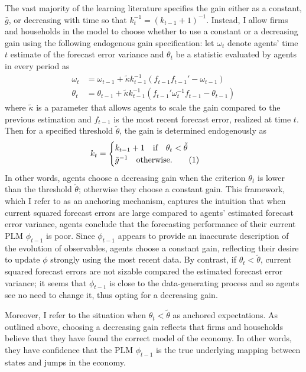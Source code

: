\documentclass[11pt]{article}
\renewcommand{\[}{\begin{equation}}
\renewcommand{\]}{\end{equation}}
\newcommand\numberthis{\addtocounter{equation}{1}\tag{\theequation}} %
\begin{document}
The vast majority of the learning literature specifies the gain either as a constant, $\bar{g}$, or decreasing with time so that $k_t^{-1} = (k_{t-1}+1)^{-1}$. Instead, I allow firms and households in the model to choose whether to use a constant or a decreasing gain using the following endogenous gain specification: let $\omega_t$ denote agents' time $t$ estimate of the forecast error variance and $\theta_t$ be a statistic evaluated by agents in every period as
\begin{align}
\omega_t & =  \omega_{t-1} + \tilde{\kappa} k_{t-1}^{-1}(f_{t-1} f_{t-1}'  -\omega_{t-1})\\
\theta_t & =  \theta_{t-1} + \tilde{\kappa} k_{t-1}^{-1}(f_{t-1}'\omega_t^{-1}f_{t-1} -\theta_{t-1}) \label{cusum_crit}
\end{align}
where $\tilde{\kappa}$ is a parameter that allows agents to scale the gain compared to the previous estimation and $f_{t-1}$ is the most recent forecast error, realized at time $t$. Then for a specified threshold $\tilde{\theta}$, the gain is determined endogenously as
\begin{align*}
k_t & = \begin{cases} k_{t-1}+1 \quad \text{if} \quad \theta_t < \tilde{\theta}  \\ \bar{g}^{-1}  \quad \text{otherwise.}\numberthis \label{anchoring}
\end{cases} 
\end{align*}
In other words, agents choose a decreasing gain when the criterion $\theta_t$ is lower than the threshold $\tilde{\theta}$; otherwise they choose a constant gain. This framework, which I refer to as an anchoring mechanism, captures the intuition that when current squared forecast errors are large compared to agents' estimated forecast error variance, agents conclude that the forecasting performance of their current PLM $\phi_{t-1}$ is poor. Since $\phi_{t-1}$ appears to provide an inaccurate description of the evolution of observables, agents choose a constant gain, reflecting their desire to update $\phi$ strongly using the most recent data. By contrast, if $\theta_t <\tilde{\theta}$, current squared forecast errors are not sizable compared the estimated forecast error variance; it seems that $\phi_{t-1}$ is close to the data-generating process and so agents see no need to change it, thus opting for a decreasing gain.

Moreover, I refer to the situation when $\theta_t <\tilde{\theta}$ as anchored expectations. As outlined above, choosing a decreasing gain reflects that firms and households believe that they have found the correct model of the economy. In other words, they have confidence that the PLM $\phi_{t-1}$ is the true underlying mapping between states and jumps in the economy. 
\end{document}
